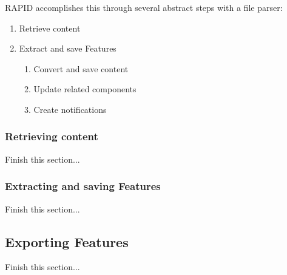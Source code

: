 RAPID accomplishes this through several abstract steps with a file parser:

 \begin{enumerate}
   \item Retrieve content
   \item Extract and save Features
   \begin{enumerate}
     \item Convert and save content
     \item Update related components
     \item Create notifications
   \end{enumerate}
 \end{enumerate}
 
 \subsubsection{Retrieving content}
 
 Finish this section...
 
 \subsubsection{Extracting and saving Features}
 Finish this section...

\subsection{Exporting Features}
Finish this section...


